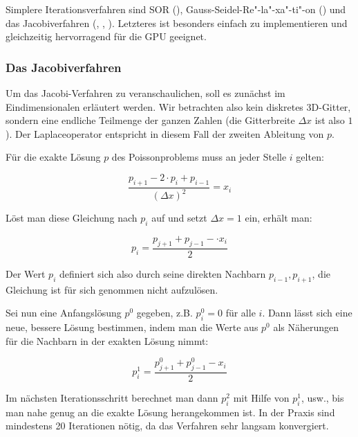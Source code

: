 Simplere Iterationsverfahren sind SOR (\cite{Saltvik2006}),
Gauss-Seidel-Re"-la"-xa"-ti"-on (\cite{Stam2003}) und das
Jacobiverfahren (\cite{Crane2007}, \cite{Harris2008},
\cite{Peschel2009}). Letzteres ist besonders einfach zu
implementieren und gleichzeitig hervorragend für die GPU geeignet.

\subsubsection{Das Jacobiverfahren}

Um das Jacobi-Verfahren zu veranschaulichen, soll es zunächst im
Eindimensionalen erläutert werden. Wir betrachten also kein diskretes 3D-Gitter,
sondern eine endliche Teilmenge der ganzen Zahlen (die Gitterbreite $\Delta x$
ist also $1$). Der Laplaceoperator entspricht in diesem Fall der zweiten
Ableitung von $p$.

Für die exakte Lösung $p$ des Poissonproblems muss an jeder Stelle $i$ gelten:

\begin{equation}
\label{eq:stam_jacobi_onedimensional}
\frac{
	p_{i+1} -
	2 \cdot p_{i} +
	p_{i-1}
}
{
	(\Delta x)^2
}
=
x_i
\end{equation}

Löst man diese Gleichung nach $p_i$ auf und setzt $\Delta x = 1$ ein, erhält
man:

\begin{equation}
p_i
=
\frac{
	p_{j+1} +
	p_{j-1} -
	\cdot x_i
}
{
	2
}
\end{equation}

Der Wert $p_i$ definiert sich also durch seine direkten Nachbarn $p_{i-1},
p_{i+1}$, die Gleichung ist für sich genommen nicht aufzulösen.

Sei nun eine Anfangslösung $p^0$ gegeben, z.B. $p^0_i = 0$ für alle $i$.
Dann lässt sich eine neue, bessere Lösung bestimmen, indem man die Werte aus
$p^0$ als Näherungen für die Nachbarn in der exakten Lösung nimmt:

\begin{equation}
\label{eq:stam_jacobi_onedimensional_iterative_solution}
p_i^1
=
\frac{
	p_{j+1}^{0} + p_{j-1}^{0} - x_i
}
{
	2
}
\end{equation}

Im nächsten Iterationsschritt berechnet man dann $p_i^2$ mit Hilfe von $p_i^1$,
usw., bis man nahe genug an die exakte Lösung herangekommen ist. In der Praxis
sind mindestens 20 Iterationen nötig, da das Verfahren sehr langsam konvergiert.

